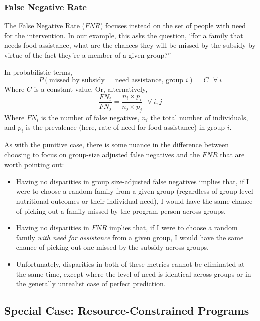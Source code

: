 \documentclass[]{krantz}
\begin{document}
\subsubsection{False Negative Rate}\label{false-negative-rate}

The False Negative Rate (\(FNR\)) focuses instead on the set of people
with need for the intervention. In our example, this asks the question,
``for a family that needs food assistance, what are the chances they
will be missed by the subsidy by virtue of the fact they're a member of
a given group?''

In probabilistic terms,
\[P(\textrm{missed by subsidy $\mid$ need assistance, group $i$}) = C~~~\forall~i\]
Where \(C\) is a constant value. Or, alternatively,
\[\frac{FN_i}{FN_j} = \frac{n_i \times p_i}{n_j \times p_j}~~~\forall~i,j\]
Where \(FN_i\) is the number of false negatives, \(n_i\) the total
number of individuals, and \(p_i\) is the prevalence (here, rate of need
for food assistance) in group \(i\).

As with the punitive case, there is some nuance in the difference
between choosing to focus on group-size adjusted false negatives and the
\(FNR\) that are worth pointing out:

\begin{itemize}
\item
  Having no disparities in group size-adjusted false negatives implies
  that, if I were to choose a random family from a given group
  (regardless of group-level nutritional outcomes or their individual
  need), I would have the same chance of picking out a family missed by
  the program person across groups.
\item
  Having no disparities in \(FNR\) implies that, if I were to choose a
  random family \emph{with need for assistance} from a given group, I
  would have the same chance of picking out one missed by the subsidy
  across groups.
\item
  Unfortunately, disparities in both of these metrics cannot be
  eliminated at the same time, except where the level of need is
  identical across groups or in the generally unrealist case of perfect
  prediction.
\end{itemize}

\hypertarget{sec:constrainedassistive}{\subsection{Special Case:
Resource-Constrained Programs}\label{sec:constrainedassistive}}
\end{document}
